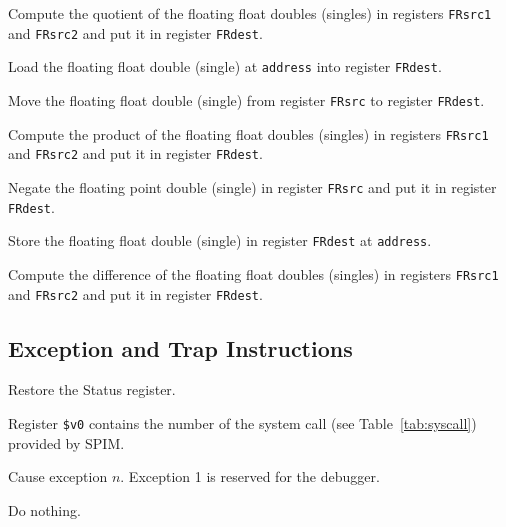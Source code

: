 \documentclass[11pt]{article}
\begin{document}
Compute the quotient of the floating float doubles (singles) in
registers {\tt FRsrc1} and {\tt FRsrc2} and put it in register
{\tt FRdest}.

Load the floating float double (single) at {\tt address} into register
{\tt FRdest}.

Move the floating float double (single) from register {\tt FRsrc} to
register {\tt FRdest}.

Compute the product of the floating float doubles (singles) in
registers {\tt FRsrc1} and {\tt FRsrc2} and put it in register
{\tt FRdest}.

Negate the floating point double (single) in register {\tt FRsrc}
and put it in register {\tt FRdest}.

Store the floating float double (single) in register {\tt FRdest} at
{\tt address}.

Compute the difference of the floating float doubles (singles) in
registers {\tt FRsrc1} and {\tt FRsrc2} and put it in register
{\tt FRdest}.


\subsection {Exception and Trap Instructions}

Restore the Status register.

Register {\tt \$v0} contains the number of the system call (see
Table~\ref{tab:syscall}) provided by SPIM.

Cause exception $n$.  Exception 1 is reserved for the debugger.

Do nothing.
\end{document}
